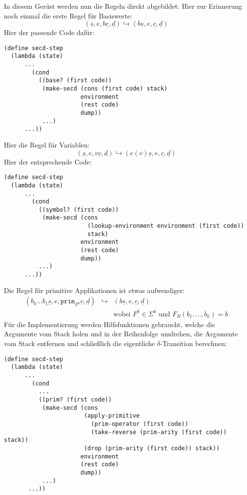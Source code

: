 %
In diesem Gerüst werden nun die Regeln direkt abgebildet.  Hier zur
Erinnerung noch einmal die erste Regel für Basiswerte:
%
\begin{displaymath}
  (\underline{s}, e, b\underline{c}, \underline{d})
  \hookrightarrow
  (b\underline{s}, e, \underline{c}, \underline{d})
\end{displaymath}
%
Hier der passende Code dafür:
%
\begin{lstlisting}
(define secd-step
  (lambda (state)
      ...
        (cond
          ((base? (first code))
           (make-secd (cons (first code) stack)
                      environment
                      (rest code)
                      dump))
           ...)
      ...))
\end{lstlisting}
%
Hier die Regel für Variablen:
\begin{displaymath}
  (\underline{s}, e, v\underline{c}, \underline{d})
  \hookrightarrow
  (e(v)\underline{s}, e, \underline{c}, \underline{d})
\end{displaymath}
%
Hier der entsprechende Code:
%
\begin{lstlisting}
(define secd-step
  (lambda (state)
      ...
        (cond
          ((symbol? (first code))
           (make-secd (cons
                        (lookup-environment environment (first code))
                        stack)
                      environment
                      (rest code)
                      dump))
          ...)
      ...))
\end{lstlisting}
%
Die Regel für primitive Applikationen ist etwas aufwendiger:
%
\begin{eqnarray*}
  (b_k\ldots b_1 \underline{s}, e, \mathtt{prim}_{F^k}\underline{c}, \underline{d})
  &\hookrightarrow&
  (b\underline{s}, e, \underline{c}, \underline{d})
  \\ && \textrm{wobei $F^k\in\Sigma^k$ und $F_B(b_1,\ldots,b_k) = b$}
\end{eqnarray*}
%
Für die Implementierung werden Hilfsfunktionen gebraucht, welche die
Argumente vom Stack holen und in der Reihenfolge umdrehen, die
Argumente vom Stack entfernen und schließlich die eigentliche
$\delta$-Transition berechnen:
%
\begin{lstlisting}
(define secd-step
  (lambda (state)
      ...
        (cond
          ...
          ((prim? (first code))
           (make-secd (cons
                       (apply-primitive
                         (prim-operator (first code))
                         (take-reverse (prim-arity (first code)) stack))
                       (drop (prim-arity (first code)) stack))
                      environment
                      (rest code)
                      dump))
           ...)
       ...))
\end{lstlisting}
